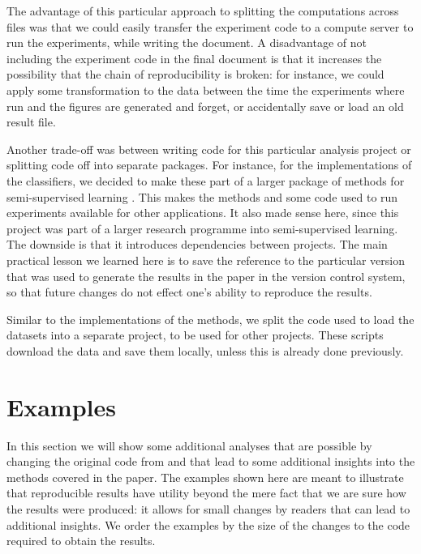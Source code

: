 \documentclass[twoside]{memoir}\usepackage[]{graphicx}\usepackage{xcolor}
\renewcommand{\cite}{\citep}
\begin{document}
The advantage of this particular approach to splitting the computations across files was that we could easily transfer the experiment code to a compute server to run the experiments, while writing the document. A disadvantage of not including the experiment code in the final document is that it increases the possibility that the chain of reproducibility is broken: for instance, we could apply some transformation to the data between the time the experiments where run and the figures are generated and forget, or accidentally save or load an old result file.

Another trade-off was between writing code for this particular analysis project or splitting code off into separate packages. For instance, for the implementations of the classifiers, we decided to make these part of a larger package of methods for semi-supervised learning \cite{Krijthe2016rssl}. This makes the methods and some code used to run experiments available for other applications. It also made sense here, since this project was part of a larger research programme into semi-supervised learning. The downside is that it introduces dependencies between projects. The main practical lesson we learned here is to save the reference to the particular version that was used to generate the results in the paper in the version control system, so that future changes do not effect one's ability to reproduce the results.

Similar to the implementations of the methods, we split the code used to load the datasets into a separate project, to be used for other projects. These scripts download the data and save them locally, unless this is already done previously.

\section{Examples}
\label{section:exampleperformance}
In this section we will show some additional analyses that are possible by changing the original code from \citet{Krijthe2016a} and that lead to some additional insights into the methods covered in the paper. The examples shown here are meant to illustrate that reproducible results have utility beyond the mere fact that we are sure how the results were produced: it allows for small changes by readers that can lead to additional insights. We order the examples by the size of the changes to the code required to obtain the results.
\end{document}
